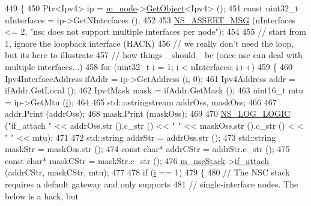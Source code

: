 \begin{DoxyCode}
449 \{
450   Ptr<Ipv4> ip = \hyperlink{classns3_1_1NscTcpL4Protocol_a1a7121d0e0f775582e6b01a3e7bc1a6c}{m\_node}->\hyperlink{classns3_1_1Object_a13e18c00017096c8381eb651d5bd0783}{GetObject}<Ipv4> ();
451   \textcolor{keyword}{const} uint32\_t nInterfaces = ip->GetNInterfaces ();
452 
453   \hyperlink{assert_8h_aff5ece9066c74e681e74999856f08539}{NS\_ASSERT\_MSG} (nInterfaces <= 2, \textcolor{stringliteral}{"nsc does not support multiple interfaces per node"});
454 
455   \textcolor{comment}{// start from 1, ignore the loopback interface (HACK)}
456   \textcolor{comment}{// we really don't need the loop, but its here to illustrate}
457   \textcolor{comment}{// how things \_should\_ be (once nsc can deal with multiple interfaces...)}
458   \textcolor{keywordflow}{for} (uint32\_t \hyperlink{bernuolliDistribution_8m_a6f6ccfcf58b31cb6412107d9d5281426}{i} = 1; \hyperlink{bernuolliDistribution_8m_a6f6ccfcf58b31cb6412107d9d5281426}{i} < nInterfaces; \hyperlink{bernuolliDistribution_8m_a6f6ccfcf58b31cb6412107d9d5281426}{i}++)
459     \{
460       Ipv4InterfaceAddress ifAddr = ip->GetAddress (\hyperlink{bernuolliDistribution_8m_a6f6ccfcf58b31cb6412107d9d5281426}{i}, 0);
461       Ipv4Address addr = ifAddr.GetLocal ();
462       Ipv4Mask mask = ifAddr.GetMask ();
463       uint16\_t mtu = ip->GetMtu (\hyperlink{bernuolliDistribution_8m_a6f6ccfcf58b31cb6412107d9d5281426}{i});
464 
465       std::ostringstream addrOss, maskOss;
466 
467       addr.Print (addrOss);
468       mask.Print (maskOss);
469 
470       \hyperlink{group__logging_ga88acd260151caf2db9c0fc84997f45ce}{NS\_LOG\_LOGIC} (\textcolor{stringliteral}{"if\_attach "} << addrOss.str ().c\_str () << \textcolor{stringliteral}{" "} << maskOss.str ().c\_str () <
      < \textcolor{stringliteral}{" "} << mtu);
471 
472       std::string addrStr = addrOss.str ();
473       std::string maskStr = maskOss.str ();
474       \textcolor{keyword}{const} \textcolor{keywordtype}{char}* addrCStr = addrStr.c\_str ();
475       \textcolor{keyword}{const} \textcolor{keywordtype}{char}* maskCStr = maskStr.c\_str ();
476       \hyperlink{classns3_1_1NscTcpL4Protocol_abf40617904f5f2e4424ab79545efb04f}{m\_nscStack}->\hyperlink{structINetStack_aa092e60f18b07a756727ef3d48fb23c2}{if\_attach} (addrCStr, maskCStr, mtu);
477 
478       \textcolor{keywordflow}{if} (\hyperlink{bernuolliDistribution_8m_a6f6ccfcf58b31cb6412107d9d5281426}{i} == 1)
479         \{
480           \textcolor{comment}{// The NSC stack requires a default gateway and only supports}
481           \textcolor{comment}{// single-interface nodes.  The below is a hack, but}

\end{DoxyCode}
